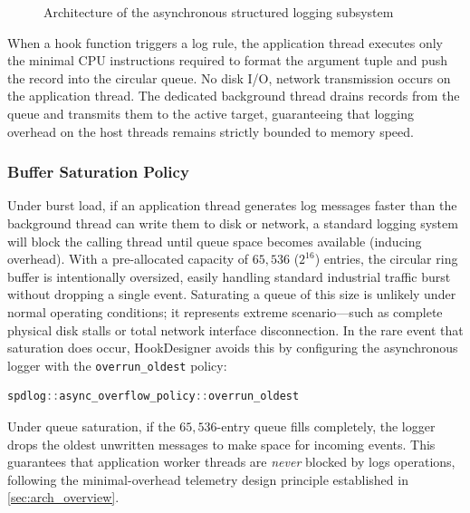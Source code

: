 \begin{figure}[H]
	\caption{Architecture of the asynchronous structured logging subsystem}
	\label{fig:async_logging_arch}
\end{figure}

When a hook function triggers a log rule, the application thread executes only the minimal CPU instructions required to format the argument tuple and push the record into the circular queue.
No disk I/O, network transmission occurs on the application thread.
The dedicated background thread drains records from the queue and transmits them to the active target, guaranteeing that logging overhead on the host threads remains strictly bounded to memory speed.

\subsubsection{Buffer Saturation Policy}

Under burst load, if an application thread generates log messages faster than the background thread can write them to disk or network, a standard logging system will  block the calling thread until queue space becomes available (inducing overhead).
With a pre-allocated capacity of $65{,}536$ ($2^{16}$) entries, the circular ring buffer is intentionally oversized, easily handling standard industrial traffic burst without dropping a single event.
Saturating a queue of this size is unlikely under normal operating conditions; it represents extreme scenario---such as complete physical disk stalls or total network interface disconnection.
In the rare event that saturation does occur, HookDesigner avoids this by configuring the asynchronous logger with the \texttt{overrun\_oldest} policy:
\begin{lstlisting}[language=C++, basicstyle=\ttfamily\footnotesize]
spdlog::async_overflow_policy::overrun_oldest
\end{lstlisting}
Under queue saturation, if the $65{,}536$-entry queue fills completely, the logger drops the oldest unwritten messages to make space for incoming events.
This guarantees that application worker threads are \emph{never} blocked by logs operations, following the minimal-overhead telemetry design principle established in \cref{sec:arch_overview}.

